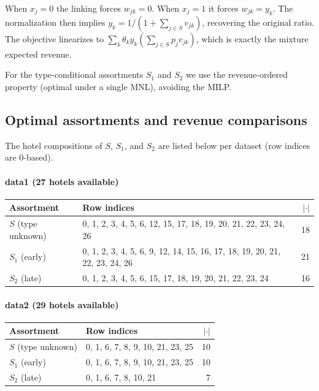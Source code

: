 \documentclass[11pt]{article}
\begin{document}
When $x_j = 0$ the linking forces $w_{jk} = 0$. When $x_j = 1$ it forces $w_{jk} = y_k$. The normalization then implies $y_k = 1 / (1 + \sum_{j \in S} v_{jk})$, recovering the original ratio. The objective linearizes to $\sum_k \theta_k y_k (\sum_{j \in S} p_j v_{jk})$, which is exactly the mixture expected revenue.

For the type-conditional assortments $S_1$ and $S_2$ we use the revenue-ordered property (optimal under a single MNL), avoiding the MILP.

\subsection*{Optimal assortments and revenue comparisons}

The hotel compositions of $S$, $S_1$, and $S_2$ are listed below per dataset (row indices are 0-based).

\paragraph{data1 \textnormal{(27 hotels available)}}
\begin{center}\small
\begin{tabular}{p{3.2cm}p{9.5cm}r}
\toprule
Assortment & Row indices & $|\cdot|$ \\
\midrule
$S$ (type unknown)  & 0, 1, 2, 3, 4, 5, 6, 12, 15, 17, 18, 19, 20, 21, 22, 23, 24, 26 & 18 \\
$S_1$ (early)       & 0, 1, 2, 3, 4, 5, 6, 9, 12, 14, 15, 16, 17, 18, 19, 20, 21, 22, 23, 24, 26 & 21 \\
$S_2$ (late)        & 0, 1, 2, 3, 4, 5, 6, 15, 17, 18, 19, 20, 21, 22, 23, 24 & 16 \\
\bottomrule
\end{tabular}
\end{center}

\paragraph{data2 \textnormal{(29 hotels available)}}
\begin{center}\small
\begin{tabular}{p{3.2cm}p{9.5cm}r}
\toprule
Assortment & Row indices & $|\cdot|$ \\
\midrule
$S$ (type unknown)  & 0, 1, 6, 7, 8, 9, 10, 21, 23, 25 & 10 \\
$S_1$ (early)       & 0, 1, 6, 7, 8, 9, 10, 21, 23, 25 & 10 \\
$S_2$ (late)        & 0, 1, 6, 7, 8, 10, 21 & 7 \\
\bottomrule
\end{tabular}
\end{center}
\end{document}
